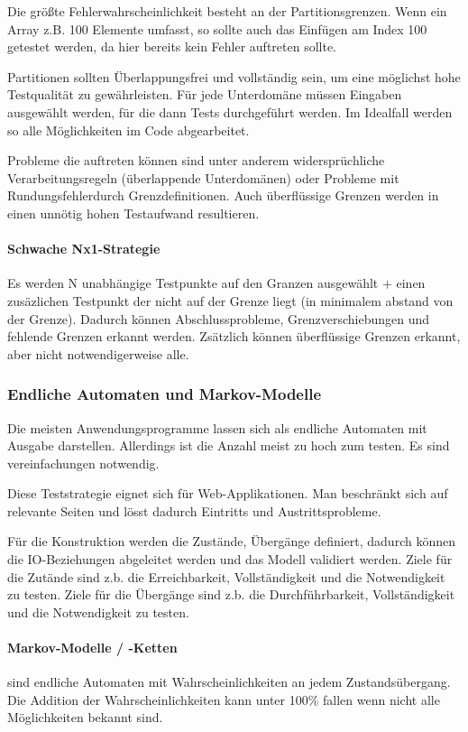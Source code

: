 Die größte Fehlerwahrscheinlichkeit besteht an der Partitionsgrenzen. Wenn ein Array z.B. 100 Elemente umfasst, so sollte auch das Einfügen am Index 100 getestet werden, da hier bereits kein Fehler auftreten sollte.

Partitionen sollten Überlappungsfrei und vollständig sein, um eine möglichst hohe Testqualität zu gewährleisten. Für jede Unterdomäne müssen Eingaben ausgewählt werden, für die dann Tests durchgeführt werden. Im Idealfall werden so alle Möglichkeiten im Code abgearbeitet.

Probleme die auftreten können sind unter anderem widersprüchliche Verarbeitungsregeln (überlappende Unterdomänen) oder Probleme mit Rundungsfehlerdurch Grenzdefinitionen. Auch überflüssige Grenzen werden in einen unnötig hohen Testaufwand resultieren.

\paragraph{Schwache Nx1-Strategie}
Es werden N unabhängige Testpunkte auf den Granzen ausgewählt + einen zusäzlichen Testpunkt der nicht auf der Grenze liegt (in minimalem abstand von der Grenze). Dadurch können Abschlussprobleme, Grenzverschiebungen und fehlende Grenzen erkannt werden. Zsätzlich können überflüssige Grenzen erkannt, aber nicht notwendigerweise alle.

\subsubsection{Endliche Automaten und Markov-Modelle}
Die meisten Anwendungsprogramme lassen sich als endliche Automaten mit Ausgabe darstellen. Allerdings ist die Anzahl meist zu hoch zum testen. Es sind vereinfachungen notwendig.

Diese Teststrategie eignet sich für Web-Applikationen. Man beschränkt sich auf relevante Seiten und lösst dadurch Eintritts und Austrittsprobleme.

Für die Konstruktion werden die Zustände, Übergänge definiert, dadurch können die IO-Beziehungen abgeleitet werden und das Modell validiert werden. Ziele für die Zutände sind z.b. die Erreichbarkeit, Vollständigkeit und die Notwendigkeit zu testen. Ziele für die Übergänge sind z.b. die Durchführbarkeit, Vollständigkeit und die Notwendigkeit zu testen.

\paragraph{Markov-Modelle / -Ketten} sind endliche Automaten mit Wahrscheinlichkeiten an jedem Zustandsübergang. Die Addition der Wahrscheinlichkeiten kann unter 100\% fallen wenn nicht alle Möglichkeiten bekannt sind.

